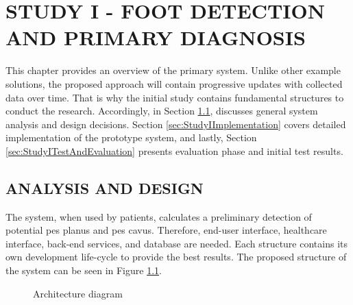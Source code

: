 \chapter{STUDY I - FOOT DETECTION AND PRIMARY DIAGNOSIS}\label{chp:Foot Detection & Primary Diagnosis}

This chapter provides an overview of the primary system. Unlike other example solutions, the proposed approach will contain progressive updates with collected data over time. That is why the initial study contains fundamental structures to conduct the research. Accordingly, in Section \ref{sec:StudyIAnalysisAndDesign}, discusses general system analysis and design decisions. Section \ref{sec:StudyIImplementation} covers detailed implementation of the prototype system, and lastly, Section \ref{sec:StudyITestAndEvaluation} presents evaluation phase and initial test results.

\section{ANALYSIS AND DESIGN}\label{sec:StudyIAnalysisAndDesign}

The system, when used by patients, calculates a preliminary detection of potential pes planus and pes cavus. Therefore, end-user interface, healthcare interface, back-end services, and database are needed. Each structure contains its own development life-cycle to provide the best results. The proposed structure of the system can be seen in Figure \ref{fig:GeneralArchitectureDiagram}.

\begin{figure}[htbp]
\centering
{}
\caption{Architecture diagram}
\label{fig:GeneralArchitectureDiagram}
\end{figure}

